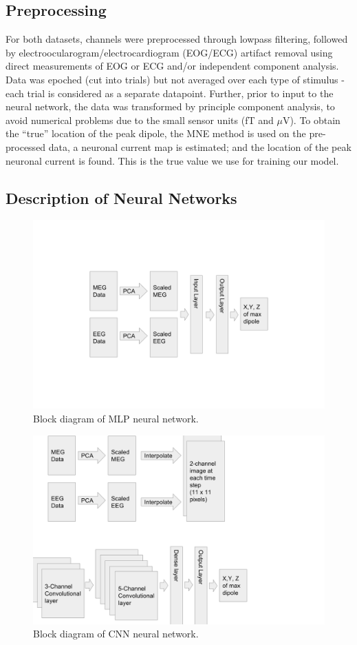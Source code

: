 \documentclass[journal]{IEEEtran}
\begin{document}
\subsection{Preprocessing}
For both datasets, channels were preprocessed through lowpass filtering, followed by electroocularogram/electrocardiogram (EOG/ECG) artifact removal using direct measurements of EOG or ECG and/or independent component analysis. Data was epoched (cut into trials) but not averaged over each type of stimulus - each trial is considered as a separate datapoint. Further, prior to input to the neural network, the data was transformed by principle component analysis, to avoid numerical problems due to the small sensor units (fT and $\mu$V). To obtain the ``true'' location of the peak dipole, the MNE method is used on the pre-processed data, a neuronal current map is estimated; and the location of the peak neuronal current is found. This is the true value we use for training our model.

\subsection{Description of Neural Networks} 
\begin{figure}[h!]
\centering
\includegraphics[width=5in]{mlp}
\caption{Block diagram of MLP neural network.}
\label{fig:mlp}
\end{figure}


\begin{figure}[h!]
\centering
\includegraphics[width=5in]{cnn}
\caption{Block diagram of CNN neural network.}
\label{fig:cnn}
\end{figure}
\end{document}
